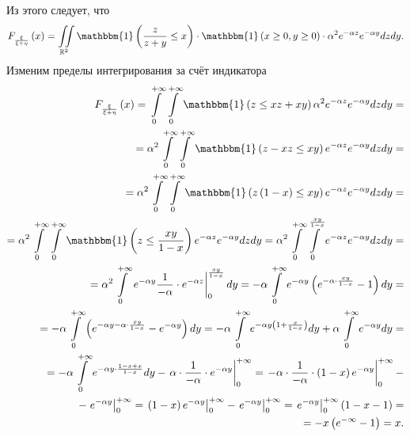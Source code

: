 Из этого следует, что
$$F_{ \frac{ \xi }{ \xi + \eta }} \left( x \right) =
\iint \limits_{ \mathbb{R}^2} \mathbbm{1} \left( \frac{z}{z+y} \leq x \right) \cdot
\mathbbm{1} \left( x \geq 0, y \geq 0 \right) \cdot \alpha^2 e^{- \alpha z} e^{- \alpha y} dzdy.$$
Изменим пределы интегрирования за счёт индикатора
\begin{equation*}
\begin{split}
F_{ \frac{ \xi }{ \xi + \eta }} \left( x \right) =
\int \limits_0^{+ \infty } \int \limits_0^{+ \infty } \mathbbm{1} \left( z \leq xz + xy \right) \alpha^2 e^{- \alpha z} e^{- \alpha y} dzdy = \\
= \alpha^2 \int \limits_0^{+ \infty } \int \limits_0^{+ \infty } \mathbbm{1} \left( z - xz \leq xy \right) e^{- \alpha z} e^{- \alpha y} dzdy = \\
= \alpha^2 \int \limits_0^{+ \infty } \int \limits_0^{+ \infty } \mathbbm{1} \left( z \left( 1 - x\right) \leq xy \right) e^{- \alpha z} e^{- \alpha y} dzdy = \\
= \alpha^2 \int \limits_0^{+ \infty } \int \limits_0^{+ \infty } \mathbbm{1} \left( z \leq \frac{xy}{1-x} \right) e^{- \alpha z} e^{- \alpha y} dzdy =
\alpha^2 \int \limits_0^{+ \infty } \int \limits_0^{ \frac{xy}{1-x}} e^{- \alpha z} e^{- \alpha y} dzdy = \\
= \alpha^2 \int \limits_0^{+ \infty } \left. e^{- \alpha y} \frac{1}{- \alpha } \cdot e^{- \alpha z} \right|_0^{ \frac{xy}{1-x}} dy =
- \alpha \int \limits_0^{+ \infty } e^{- \alpha y} \left( e^{- \alpha \cdot \frac{xy}{1-x}} - 1 \right) dy = \\
= - \alpha \int \limits_0^{+ \infty } \left( e^{- \alpha y - \alpha \cdot \frac{xy}{1-x}} - e^{- \alpha y} \right) dy =
- \alpha \int \limits_0^{+ \infty } e^{- \alpha y \left( 1 + \frac{x}{1-x} \right) } dy + \alpha \int \limits_0^{+ \infty } e^{- \alpha y} dy = \\
= - \alpha \int \limits_0^{+ \infty } e^{- \alpha y \cdot \frac{1-x+x}{1-x}} dy - \left. \alpha \cdot \frac{1}{- \alpha } \cdot e^{- \alpha y} \right|_0^{+ \infty } =
\left. - \alpha \cdot \frac{1}{- \alpha } \cdot \left( 1-x \right) e^{- \alpha y} \right|_0^{+ \infty } - \\
- \left. e^{- \alpha y} \right|_0^{+ \infty } =
\left. \left( 1-x \right) e^{- \alpha y} \right|_0^{+ \infty } - \left. e^{- \alpha y} \right|_0^{+ \infty } =
\left. e^{- \alpha y} \right|_0^{+ \infty } \left( 1-x-1 \right) = \\
= -x \left( e^{- \infty } -1 \right) =
x.
\end{split}
\end{equation*}

